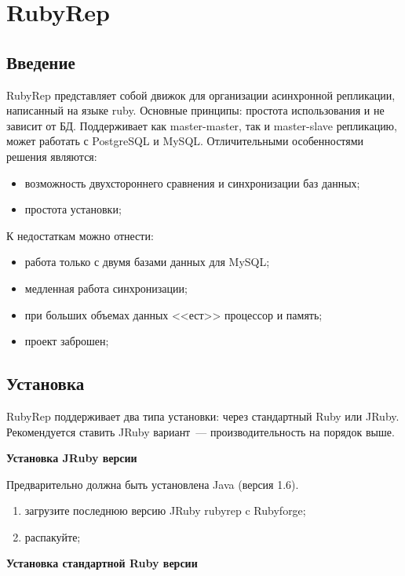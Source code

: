 \section{RubyRep}

\subsection{Введение}

RubyRep представляет собой движок для организации асинхронной репликации, написанный на языке ruby. Основные принципы: простота использования и не зависит от БД. Поддерживает как master-master, так и master-slave репликацию, может работать с PostgreSQL и MySQL. Отличительными особенностями решения являются:

\begin{itemize}
  \item возможность двухстороннего сравнения и синхронизации баз данных;
  \item простота установки;
\end{itemize}

К недостаткам можно отнести:

\begin{itemize}
  \item работа только с двумя базами данных для MySQL;
  \item медленная работа синхронизации;
  \item при больших объемах данных <<ест>> процессор и память;
  \item проект заброшен;
\end{itemize}


\subsection{Установка}

RubyRep поддерживает два типа установки: через стандартный Ruby или JRuby. Рекомендуется ставить JRuby вариант~--- производительность на порядок выше.

\textbf{Установка JRuby версии}

Предварительно должна быть установлена Java (версия 1.6).

\begin{enumerate}
 \item загрузите последнюю версию JRuby rubyrep c Rubyforge;
 \item распакуйте;
\end{enumerate}

\textbf{Установка стандартной Ruby версии}

